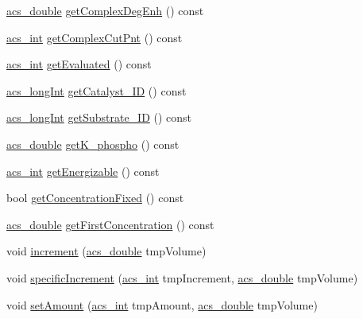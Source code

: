 \begin{DoxyCompactItemize}
\item 
\hyperlink{acs__headers_8h_ab776853a005fcbf56af0424a2a4dd607}{acs\-\_\-double} \hyperlink{classspecies_a2870bc4874efda0a1a079eb2b326ecd9}{get\-Complex\-Deg\-Enh} () const 
\item 
\hyperlink{acs__headers_8h_a8d277355641a098190360234e2ebde35}{acs\-\_\-int} \hyperlink{classspecies_a4c87285bf983ddd5635b58ce82d02a80}{get\-Complex\-Cut\-Pnt} () const 
\item 
\hyperlink{acs__headers_8h_a8d277355641a098190360234e2ebde35}{acs\-\_\-int} \hyperlink{classspecies_acb08d02f3dcadd9f422d435219d1dc57}{get\-Evaluated} () const 
\item 
\hyperlink{acs__headers_8h_a19319d75f02db4308bc5c0026d98cd85}{acs\-\_\-long\-Int} \hyperlink{classspecies_a4be19a81a4de43016316832fdf8b5f35}{get\-Catalyst\-\_\-\-I\-D} () const 
\item 
\hyperlink{acs__headers_8h_a19319d75f02db4308bc5c0026d98cd85}{acs\-\_\-long\-Int} \hyperlink{classspecies_a3bc786de75d9c6235c75eeda10b01b8d}{get\-Substrate\-\_\-\-I\-D} () const 
\item 
\hyperlink{acs__headers_8h_ab776853a005fcbf56af0424a2a4dd607}{acs\-\_\-double} \hyperlink{classspecies_a22a114de19bb6c6d550b967797529e1d}{get\-K\-\_\-phospho} () const 
\item 
\hyperlink{acs__headers_8h_a8d277355641a098190360234e2ebde35}{acs\-\_\-int} \hyperlink{classspecies_ad234e523f16507008b64f2d872d9792f}{get\-Energizable} () const 
\item 
bool \hyperlink{classspecies_aa2b24de5a97f1e06d359ab5b63817d98}{get\-Concentration\-Fixed} () const 
\item 
\hyperlink{acs__headers_8h_ab776853a005fcbf56af0424a2a4dd607}{acs\-\_\-double} \hyperlink{classspecies_a6773ef96109c27ddd4afa78b87b2fcd3}{get\-First\-Concentration} () const 
\item 
void \hyperlink{classspecies_a77f68017e5c50f8943df90efd2e8a0bb}{increment} (\hyperlink{acs__headers_8h_ab776853a005fcbf56af0424a2a4dd607}{acs\-\_\-double} tmp\-Volume)
\item 
void \hyperlink{classspecies_a87e85a2397e5ec34518efa235b529d7e}{specific\-Increment} (\hyperlink{acs__headers_8h_a8d277355641a098190360234e2ebde35}{acs\-\_\-int} tmp\-Increment, \hyperlink{acs__headers_8h_ab776853a005fcbf56af0424a2a4dd607}{acs\-\_\-double} tmp\-Volume)
\item 
void \hyperlink{classspecies_abefdc30b6f352e5ce5576a610015f5b8}{set\-Amount} (\hyperlink{acs__headers_8h_a8d277355641a098190360234e2ebde35}{acs\-\_\-int} tmp\-Amount, \hyperlink{acs__headers_8h_ab776853a005fcbf56af0424a2a4dd607}{acs\-\_\-double} tmp\-Volume)

\end{DoxyCompactItemize}
